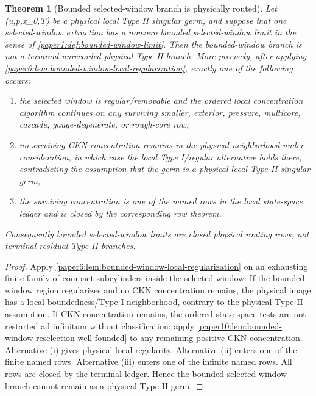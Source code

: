 \documentclass[11pt]{amsart}
\def\({}%
\def\){}%
\theoremstyle{plain}
\newtheorem{theorem}{Theorem}[section]
\theoremstyle{definition}
\theoremstyle{remark}
\begin{document}
\begin{theorem}[Bounded selected-window branch is physically routed]
\label{paper6:thm:bounded-selected-window-physical-routing}
\label{paper6:thm:bounded-window-physical-closure}
Let \((u,p,x_0,T)\) be a physical local Type II singular germ, and suppose that
one selected-window extraction has a nonzero bounded selected-window limit in
the sense of \cref{paper1:def:bounded-window-limit}.  Then the bounded-window
branch is not a terminal unrecorded physical Type II branch.  More precisely,
after applying
\cref{paper6:lem:bounded-window-local-regularization}, exactly one of the
following occurs:
\begin{enumerate}[label=\textup{(\roman*)}]
\item the selected window is regular/removable and the ordered local
concentration algorithm continues on any surviving smaller, exterior, pressure,
multicore, cascade, gauge-degenerate, or rough-core row;
\item no surviving CKN concentration remains in the physical neighborhood
under consideration, in which case the local Type I/regular alternative holds
there, contradicting the assumption that the germ is a physical local Type II
singular germ;
\item the surviving concentration is one of the named rows in the local
state-space ledger and is closed by the corresponding row theorem.
\end{enumerate}
Consequently bounded selected-window limits are closed physical routing rows,
not terminal residual Type II branches.
\end{theorem}

\begin{proof}
Apply \cref{paper6:lem:bounded-window-local-regularization} on an exhausting
finite family of compact subcylinders inside the selected window.  If the
bounded-window region regularizes and no CKN concentration remains, the
physical image has a local boundedness/Type I neighborhood, contrary to the
physical Type II assumption.  If CKN concentration remains, the ordered
state-space tests are not restarted ad infinitum without classification:
apply \cref{paper10:lem:bounded-window-reselection-well-founded} to any
remaining positive CKN concentration.  Alternative \textup{(i)} gives physical
local regularity.  Alternative \textup{(ii)} enters one of the finite named
rows.  Alternative \textup{(iii)} enters one of the infinite named rows.  All
rows are closed by the terminal ledger.  Hence the bounded selected-window
branch cannot remain as a physical Type II germ.
\end{proof}
\end{document}
